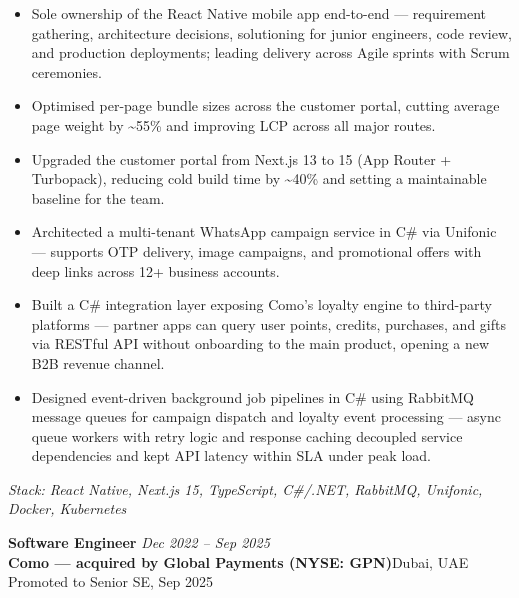 \documentclass[11pt, letterpaper]{article}
\newcommand{\job}[4]{%
  \textbf{#1} \hfill \textit{#3}\\
  \textbf{#2}\quad\textbar\quad #4
}
\begin{document}
\begin{itemize}
  \item Sole ownership of the React Native mobile app end-to-end — requirement gathering, architecture decisions, solutioning for junior engineers, code review, and production deployments; leading delivery across Agile sprints with Scrum ceremonies.
  \item Optimised per-page bundle sizes across the customer portal, cutting average page weight by \textasciitilde55\% and improving LCP across all major routes.
  \item Upgraded the customer portal from Next.js 13 to 15 (App Router + Turbopack), reducing cold build time by \textasciitilde40\% and setting a maintainable baseline for the team.
  \item Architected a multi-tenant WhatsApp campaign service in C\# via Unifonic — supports OTP delivery, image campaigns, and promotional offers with deep links across 12+ business accounts.
  \item Built a C\# integration layer exposing Como's loyalty engine to third-party platforms — partner apps can query user points, credits, purchases, and gifts via RESTful API without onboarding to the main product, opening a new B2B revenue channel.
  \item Designed event-driven background job pipelines in C\# using RabbitMQ message queues for campaign dispatch and loyalty event processing — async queue workers with retry logic and response caching decoupled service dependencies and kept API latency within SLA under peak load.
\end{itemize}
\textit{Stack: React Native, Next.js 15, TypeScript, C\#/.NET, RabbitMQ, Unifonic, Docker, Kubernetes}

\vspace{6pt}

\job{Software Engineer}{Como — acquired by Global Payments (NYSE: GPN)}{Dec 2022 – Sep 2025}{Dubai, UAE \textbar{} Promoted to Senior SE, Sep 2025}
\end{document}
